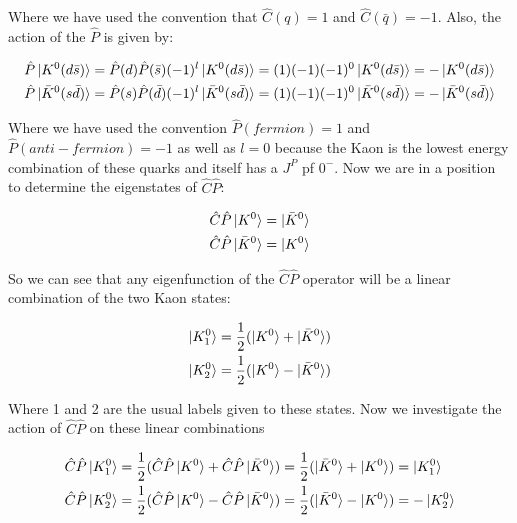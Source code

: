\noindent Where we have used the convention that $\hat{C} (q) = 1$ and $\hat{C} (\bar{q}) = -1$. Also, the action of the $\hat{P}$ is given by:
    
\begin{align*}
\hat{P} \ket{K^{0}(d \bar{s})} = \hat{P}(d) \hat{P}(\bar{s})(-1)^{l} \ket{K^{0}(d \bar{s})} = (1)(-1)(-1)^0 \ket{K^{0}(d \bar{s})} = - \ket{K^{0}(d \bar{s})} \\
\hat{P} \ket{\bar{K}^{0}(s \bar{d})} = \hat{P}(s) \hat{P}(\bar{d})(-1)^{l} \ket{\bar{K}^{0}(s \bar{d})} = (1)(-1)(-1)^0 \ket{\bar{K}^{0}(s \bar{d})} = - \ket{\bar{K}^{0}(s \bar{d})} 
\end{align*}

\smallskip

\noindent Where we have used the convention $\hat{P} (fermion) = 1$ and $\hat{P} (anti-fermion) = -1$ as well as $l=0$ because the Kaon is the lowest energy combination of these quarks and itself has a $J^{P}$ pf $0^{-}$. Now we are in a position to determine the eigenstates of $\hat{C}\hat{P}$:

\begin{align*}
\hat{C}\hat{P} \ket{K^{0}} = \ket{\bar{K}^{0}} \\
\hat{C}\hat{P} \ket{\bar{K}^{0}} = \ket{K^{0}} 
\end{align*}

\noindent So we can see that any eigenfunction of the $\hat{C}\hat{P}$ operator will be a linear combination of the two Kaon states:

\begin{align*}
\ket{K^{0}_{1}} = \frac{1}{2} (\ket{K^{0}} + \ket{\bar{K}^{0}}) \\
\ket{K^{0}_{2}} = \frac{1}{2} (\ket{K^{0}} - \ket{\bar{K}^{0}})
\end{align*} 

\noindent Where 1 and 2 are the usual labels given to these states. Now we investigate the action of $\hat{C}\hat{P}$ on these linear combinations

\smallskip

\begin{align*}
\hat{C}\hat{P} \ket{K^{0}_{1}} & = \frac{1}{2} (\hat{C}\hat{P} \ket{K^{0}} + \hat{C}\hat{P} \ket{\bar{K}^{0}}) = \frac{1}{2} (\ket{\bar{K}^{0}} + \ket{K^{0}}) = \ket{K^{0}_{1}} \\
\hat{C}\hat{P} \ket{K^{0}_{2}} & = \frac{1}{2} (\hat{C}\hat{P} \ket{K^{0}} - \hat{C}\hat{P} \ket{\bar{K}^{0}}) =   \frac{1}{2} (\ket{\bar{K}^{0}} - \ket{K^{0}}) = - \ket{K^{0}_{2}} \\
\end{align*} 

